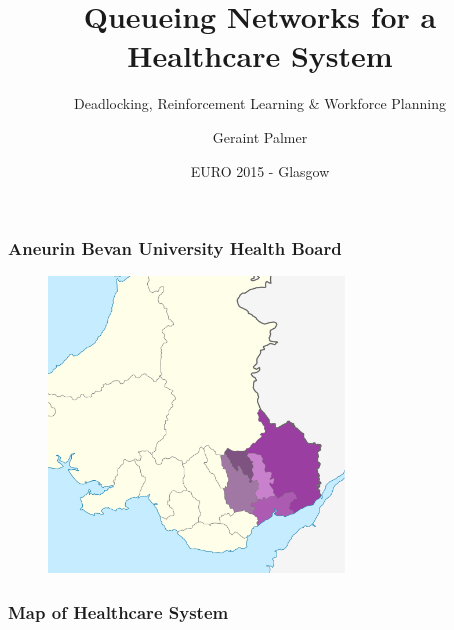 \documentclass{beamer}
\title
{Queueing Networks for a Healthcare System}
\subtitle
{Deadlocking, Reinforcement Learning \& Workforce Planning}
\author{Geraint Palmer}
\date{EURO 2015 - Glasgow}
\begin{document}
\frame{\titlepage}


\begin{frame}
\frametitle{Aneurin Bevan University Health Board}
\begin{figure}
\includegraphics[width=0.7\textwidth]{Aneurin_Bevan}
\end{figure}
\end{frame}

\begin{frame}
\frametitle{Map of Healthcare System}
\begin{figure}

\end{figure}
\end{frame}

\begin{frame}
    
\end{frame}

\begin{frame}
    
\end{frame}

\end{document}
